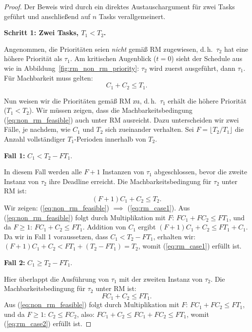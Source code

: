 ﻿\documentclass[a4paper,12pt]{report}
\theoremstyle{definition}
\begin{document}
\begin{proof}
	Der Beweis wird durch ein direktes Austauschargument für zwei Tasks geführt
	und anschließend auf $n$ Tasks verallgemeinert.

	\textbf{Schritt 1: Zwei Tasks, $T_1 < T_2$.}

	Angenommen, die Prioritäten seien \emph{nicht} gemäß RM zugewiesen, d.\,h.\
	$\tau_2$ hat eine höhere Priorität als $\tau_1$. Am kritischen Augenblick
	($t = 0$) sieht der Schedule aus wie in Abbildung~\ref{fig:rm_non_rm_priority}:
	$\tau_2$ wird zuerst ausgeführt, dann $\tau_1$. Für Machbarkeit muss gelten:
	\begin{equation}
		C_1 + C_2 \leq T_1.
		\label{eq:non_rm_feasible}
	\end{equation}

	Nun weisen wir die Prioritäten gemäß RM zu, d.\,h.\ $\tau_1$ erhält die höhere
	Priorität ($T_1 < T_2$). Wir müssen zeigen, dass die Machbarkeitsbedingung
	(\ref{eq:non_rm_feasible}) auch unter RM ausreicht. Dazu unterscheiden wir
	zwei Fälle, je nachdem, wie $C_1$ und $T_2$ sich zueinander verhalten. Sei
	$F = \lfloor T_2 / T_1 \rfloor$ die Anzahl vollständiger $T_1$-Perioden
	innerhalb von $T_2$.

	\textbf{Fall 1:} $C_1 < T_2 - F T_1$.

	In diesem Fall werden alle $F+1$ Instanzen von $\tau_1$ abgeschlossen, bevor
	die zweite Instanz von $\tau_2$ ihre Deadline erreicht. Die Machbarkeitsbedingung
	für $\tau_2$ unter RM ist:
	\begin{equation}
		(F+1)C_1 + C_2 \leq T_2.
		\label{eq:rm_case1}
	\end{equation}
	Wir zeigen: (\ref{eq:non_rm_feasible}) $\implies$ (\ref{eq:rm_case1}). Aus
	(\ref{eq:non_rm_feasible}) folgt durch Multiplikation mit $F$:
	$F C_1 + F C_2 \leq F T_1$, und da $F \geq 1$:
	$F C_1 + C_2 \leq F T_1$.
	Addition von $C_1$ ergibt $(F+1)C_1 + C_2 \leq F T_1 + C_1$.
	Da wir in Fall 1 voraussetzen, dass $C_1 < T_2 - F T_1$, erhalten wir:
	$(F+1)C_1 + C_2 < F T_1 + (T_2 - F T_1) = T_2$,
	womit (\ref{eq:rm_case1}) erfüllt ist.

	\textbf{Fall 2:} $C_1 \geq T_2 - F T_1$.

	Hier überlappt die Ausführung von $\tau_1$ mit der zweiten Instanz von $\tau_2$.
	Die Machbarkeitsbedingung für $\tau_2$ unter RM ist:
	\begin{equation}
		F C_1 + C_2 \leq F T_1.
		\label{eq:rm_case2}
	\end{equation}
	Aus (\ref{eq:non_rm_feasible}) folgt durch Multiplikation mit $F$:
	$F C_1 + F C_2 \leq F T_1$, und da $F \geq 1$: $C_2 \leq F C_2$, also:
	$F C_1 + C_2 \leq F C_1 + F C_2 \leq F T_1$,
	womit (\ref{eq:rm_case2}) erfüllt ist.


\end{proof}
\end{document}
